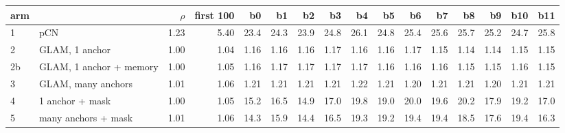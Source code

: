 \begin{tabular}{llrrrrrrrrrrrrrr}\toprule
arm & & $\rho$ & first 100 & b0 & b1 & b2 & b3 & b4 & b5 & b6 & b7 & b8 & b9 & b10 & b11 \\ \midrule
1 & pCN & 1.23 & 5.40 & 23.4 & 24.3 & 23.9 & 24.8 & 26.1 & 24.8 & 25.4 & 25.6 & 25.7 & 25.2 & 24.7 & 25.8 \\
2 & GLAM, 1 anchor & 1.00 & 1.04 & 1.16 & 1.16 & 1.16 & 1.17 & 1.16 & 1.16 & 1.17 & 1.15 & 1.14 & 1.14 & 1.15 & 1.15 \\
2b & GLAM, 1 anchor + memory & 1.00 & 1.05 & 1.16 & 1.17 & 1.17 & 1.17 & 1.17 & 1.16 & 1.16 & 1.16 & 1.15 & 1.15 & 1.16 & 1.15 \\
3 & GLAM, many anchors & 1.01 & 1.06 & 1.21 & 1.21 & 1.21 & 1.21 & 1.22 & 1.21 & 1.20 & 1.21 & 1.21 & 1.20 & 1.21 & 1.21 \\
4 & 1 anchor + mask & 1.00 & 1.05 & 15.2 & 16.5 & 14.9 & 17.0 & 19.8 & 19.0 & 20.0 & 19.6 & 20.2 & 17.9 & 19.2 & 17.0 \\
5 & many anchors + mask & 1.01 & 1.06 & 14.3 & 15.9 & 14.4 & 16.5 & 19.3 & 19.2 & 19.4 & 19.4 & 18.5 & 17.6 & 19.4 & 16.3 \\
\bottomrule\end{tabular}
